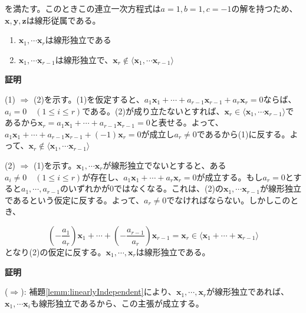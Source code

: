 \documentclass[dvipdfmx,autodetect-engine]{jsarticle}
\begin{document}
を満たす。このときこの連立一次方程式は$a = 1, b = 1, c = -1$の解を持つため、$\bm{x}, \bm{y}, \bm{z}$は線形従属である。

\label{lemm:linearlyIndependent}

\begin{enumerate}
\renewcommand{\labelenumi}{(\arabic{enumi})}
\item $\bm{x}_1, \cdots \bm{x}_r$は線形独立である
\item $\bm{x}_1, \cdots \bm{x}_{r-1}$は線形独立で、$\bm{x}_r \notin \langle \bm{x}_1, \cdots \bm{x}_{r-1} \rangle$
\end{enumerate}

{\bf 証明}

(1) $\Rightarrow$ (2)を示す。(1)を仮定すると、$a_1\bm{x}_1 + \cdots + a_{r-1}\bm{x}_{r-1} + a_r\bm{x}_r = 0$ならば、$a_i = 0 \quad (1 \leq i \leq r)$である。(2)が成り立たないとすれば、$\bm{x}_r \in \langle \bm{x}_1, \cdots \bm{x}_{r-1} \rangle$であるから$\bm{x}_r = a_1\bm{x}_1 + \cdots + a_{r-1}\bm{x}_{r-1} = 0$と表せる。よって、$a_1\bm{x}_1 + \cdots + a_{r-1}\bm{x}_{r-1} + (-1)\bm{x}_r = 0$が成立し$a_r \neq 0$であるから(1)に反する。よって、$\bm{x}_r \notin \langle \bm{x}_1, \cdots \bm{x}_{r-1} \rangle$

(2) $\Rightarrow$ (1)を示す。$\bm{x}_1, \cdots \bm{x}_r$が線形独立でないとすると、ある$a_i \neq 0 \quad (1 \leq i \leq r)$が存在し、$a_1\bm{x}_1 + \cdots + a_{r}\bm{x}_{r} = 0$が成立する。もし$a_r = 0$とすると$a_1, \cdots, a_{r-1}$のいずれかが$0$ではなくなる。これは、(2)の$\bm{x}_1, \cdots \bm{x}_{r-1}$が線形独立であるという仮定に反する。よって、$a_r \neq 0$でなければならない。しかしこのとき、

$$
 \left(-\frac{a_1}{a_r}\right)\bm{x}_1 + \cdots +  \left(-\frac{a_{r-1}}{a_r}\right)\bm{x}_{r-1} = \bm{x}_r \in \langle \bm{x}_1 + \cdots + \bm{x}_{r-1} \rangle
$$
となり(2)の仮定に反する。$\bm{x}_1, \cdots, \bm{x}_{r}$は線形独立である。

\label{rem:independent}

{\bf 証明}

($\Rightarrow$): 補題\ref{lemm:linearlyIndependent}により、$\bm{x}_1, \cdots, \bm{x}_r$が線形独立であれば、$\bm{x}_1, \cdots \bm{x}_i$も線形独立であるから、この主張が成立する。
\end{document}
